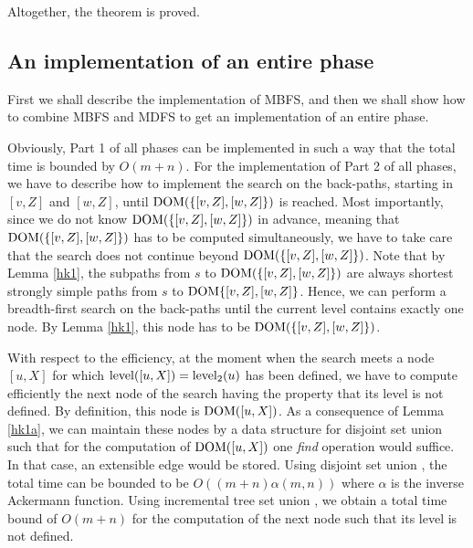 \documentclass[12pt,twoside,a4paper]{article}
\def\QED{\hbox{\hskip 1pt \vrule width4pt height 6pt depth 1.5pt \hskip 1pt}}
\def\DOM{{\rm DOM}}
\def\lev{{\rm level}}
\begin{document}
\medskip
Altogether, the theorem is proved.
\QED

\subsection{An implementation of an entire phase}

First we shall describe the implementation of MBFS, and then we shall show how to 
combine MBFS and MDFS to get an implementation of an entire phase.

Obviously, Part 1 of all phases can be implemented in such a way that the 
total time is bounded by $O(m + n)$. For the implementation of Part 2 of all 
phases, we have to describe how to implement the search on the back-paths,
starting in $[v,Z]$ and $[w,Z]$, until $\DOM(\{[v,Z],[w,Z]\})$ is reached.
Most importantly, since we do not know $\DOM(\{[v,Z],[w,Z]\})$ in advance, 
meaning that $\DOM(\{[v,Z],[w,Z]\})$ has to be computed simultaneously, we have to 
take care that the search does not continue beyond $\DOM(\{[v,Z],[w,Z]\})$.
Note that by Lemma \ref{hk1}, the subpaths from $s$ to $\DOM(\{[v,Z],[w,Z]\})$
are always shortest strongly simple paths from $s$ to $\DOM\{[v,Z],[w,Z]\}$.
Hence, we can perform a breadth-first search on the back-paths until the current 
level contains exactly one node. By Lemma \ref{hk1}, this node has to be 
$\DOM(\{[v,Z],[w,Z]\})$. 

With respect to the efficiency, at the moment when the search meets a node
$[u,X]$ for which $\lev([u,X]) = \lev_2(u)$ has been defined, we have to compute efficiently
the next node of the search having the property that its level is not defined. 
By definition, this node is $\DOM([u,X])$. As a consequence of Lemma \ref{hk1a}, we can 
maintain these nodes by a data structure for disjoint set union such that for the computation 
of $\DOM([u,X])$
one {\em find\/} operation would suffice. In that case, an extensible edge would be stored.
Using disjoint set union \cite{Ta}, the total time can be bounded to be $O((m+n)\alpha(m,n))$ 
where $\alpha$ is the inverse Ackermann function. Using incremental tree set union 
\cite{GaTa}, we obtain a total time bound of $O(m+n)$ for the computation of 
the next node such that its level is not defined.
\end{document}
